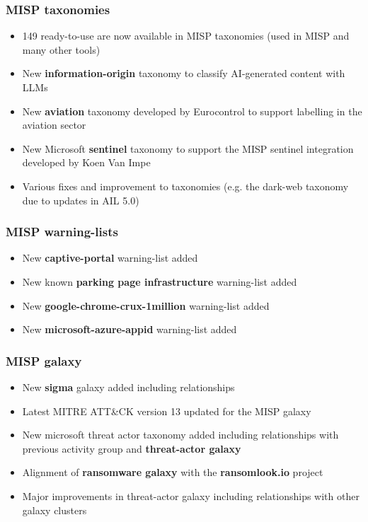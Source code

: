\begin{frame}
    \frametitle{MISP taxonomies}
    \begin{itemize}
        \item 149 ready-to-use are now available in MISP taxonomies (used in MISP and many other tools)
        \item New {\bf information-origin} taxonomy to classify AI-generated content with LLMs
        \item New {\bf aviation} taxonomy developed by Eurocontrol to support labelling in the aviation sector
        \item New Microsoft {\bf sentinel} taxonomy to support the MISP sentinel integration developed by Koen Van Impe
        \item Various fixes and improvement to taxonomies (e.g. the dark-web taxonomy due to updates in AIL 5.0)
    \end{itemize}
\end{frame}

\begin{frame}
    \frametitle{MISP warning-lists}
    \begin{itemize}
        \item New {\bf captive-portal} warning-list added
        \item New known {\bf parking page infrastructure} warning-list added 
        \item New {\bf google-chrome-crux-1million} warning-list added
        \item New {\bf microsoft-azure-appid} warning-list added
    \end{itemize}
\end{frame}

\begin{frame}
    \frametitle{MISP galaxy}
    \begin{itemize}
        \item New {\bf sigma} galaxy added including relationships
        \item Latest MITRE ATT\&CK version 13 updated for the MISP galaxy
        \item New microsoft threat actor taxonomy added including relationships with previous activity group and {\bf threat-actor galaxy}
        \item Alignment of {\bf ransomware galaxy} with the {\bf ransomlook.io} project
        \item Major improvements in threat-actor galaxy including relationships with other galaxy clusters
    \end{itemize}
\end{frame}


